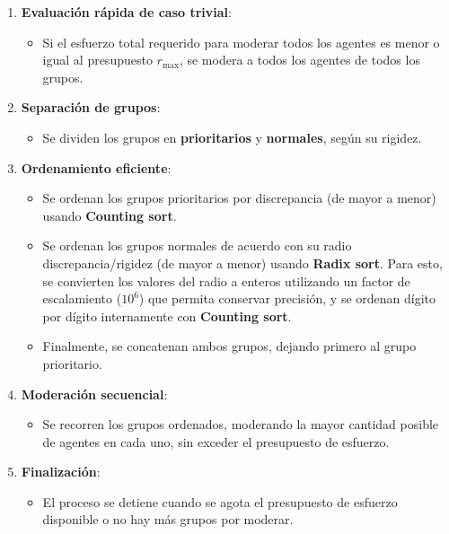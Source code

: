 \begin{enumerate}
	\item \textbf{Evaluación rápida de caso trivial}:
		\begin{itemize}
			\item Si el esfuerzo total requerido para moderar todos los agentes es menor o igual al presupuesto $r_{ \max }$, se modera a todos los agentes de todos los grupos.
		\end{itemize}

	\item \textbf{Separación de grupos}:
		\begin{itemize}
			\item Se dividen los grupos en \textbf{prioritarios} y \textbf{normales}, según su rigidez.
		\end{itemize}

	\item \textbf{Ordenamiento eficiente}:
		\begin{itemize}
			\item Se ordenan los grupos prioritarios por discrepancia (de mayor a menor) usando \textbf{Counting sort}.

			\item Se ordenan los grupos normales de acuerdo con su radio discrepancia/rigidez (de mayor a menor) usando \textbf{Radix sort}. Para esto, se convierten los valores del radio a enteros utilizando un factor de escalamiento ($10^6$) que permita conservar precisión, y se ordenan dígito por dígito internamente con \textbf{Counting sort}.

			\item Finalmente, se concatenan ambos grupos, dejando primero al grupo prioritario.
		\end{itemize}

	\item \textbf{Moderación secuencial}:
		\begin{itemize}
			\item Se recorren los grupos ordenados, moderando la mayor cantidad posible de agentes en cada uno, sin exceder el presupuesto de esfuerzo.
		\end{itemize}

	\item \textbf{Finalización}:
		\begin{itemize}
			\item El proceso se detiene cuando se agota el presupuesto de esfuerzo disponible o no hay más grupos por moderar.
		\end{itemize}
\end{enumerate}

